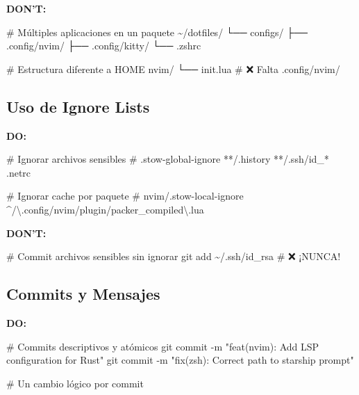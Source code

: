 \documentclass[
  doc,
  floatsintext,
  longtable,
  a4paper,
  nolmodern,
  notxfonts,
  notimes,
  12pt,
  colorlinks=true,linkcolor=blue,citecolor=blue,urlcolor=blue]{apa7}
\newenvironment{Shaded}{\begin{snugshade}}{\end{snugshade}}
\newcommand{\AttributeTok}[1]{\textcolor[rgb]{0.40,0.45,0.13}{#1}}
\newcommand{\CommentTok}[1]{\textcolor[rgb]{0.37,0.37,0.37}{#1}}
\newcommand{\ExtensionTok}[1]{\textcolor[rgb]{0.00,0.23,0.31}{#1}}
\newcommand{\FunctionTok}[1]{\textcolor[rgb]{0.28,0.35,0.67}{#1}}
\newcommand{\NormalTok}[1]{\textcolor[rgb]{0.00,0.23,0.31}{#1}}
\newcommand{\StringTok}[1]{\textcolor[rgb]{0.13,0.47,0.30}{#1}}
\begin{document}
\textbf{DON'T:}

\begin{Shaded}
\begin{Highlighting}[]
\CommentTok{\# Múltiples aplicaciones en un paquete}
\ExtensionTok{\textasciitilde{}/dotfiles/}
\ExtensionTok{└──}\NormalTok{ configs/}
    \ExtensionTok{├──}\NormalTok{ .config/nvim/}
    \ExtensionTok{├──}\NormalTok{ .config/kitty/}
    \ExtensionTok{└──}\NormalTok{ .zshrc}

\CommentTok{\# Estructura diferente a HOME}
\ExtensionTok{nvim/}
  \ExtensionTok{└──}\NormalTok{ init.lua  }\CommentTok{\# ❌ Falta .config/nvim/}
\end{Highlighting}
\end{Shaded}

\subsection{Uso de Ignore Lists}\label{uso-de-ignore-lists}

\textbf{DO:}

\begin{Shaded}
\begin{Highlighting}[]
\CommentTok{\# Ignorar archivos sensibles}
\CommentTok{\# .stow{-}global{-}ignore}
\ExtensionTok{**/.history}
\ExtensionTok{**/.ssh/id\_*}
\ExtensionTok{.netrc}

\CommentTok{\# Ignorar cache por paquete}
\CommentTok{\# nvim/.stow{-}local{-}ignore}
\ExtensionTok{\^{}/\textbackslash{}.config/nvim/plugin/packer\_compiled\textbackslash{}.lua}
\end{Highlighting}
\end{Shaded}

\textbf{DON'T:}

\begin{Shaded}
\begin{Highlighting}[]
\CommentTok{\# Commit archivos sensibles sin ignorar}
\FunctionTok{git}\NormalTok{ add \textasciitilde{}/.ssh/id\_rsa  }\CommentTok{\# ❌ ¡NUNCA!}
\end{Highlighting}
\end{Shaded}

\subsection{Commits y Mensajes}\label{commits-y-mensajes}

\textbf{DO:}

\begin{Shaded}
\begin{Highlighting}[]
\CommentTok{\# Commits descriptivos y atómicos}
\FunctionTok{git}\NormalTok{ commit }\AttributeTok{{-}m} \StringTok{"feat(nvim): Add LSP configuration for Rust"}
\FunctionTok{git}\NormalTok{ commit }\AttributeTok{{-}m} \StringTok{"fix(zsh): Correct path to starship prompt"}

\CommentTok{\# Un cambio lógico por commit}
\end{Highlighting}
\end{Shaded}
\end{document}
